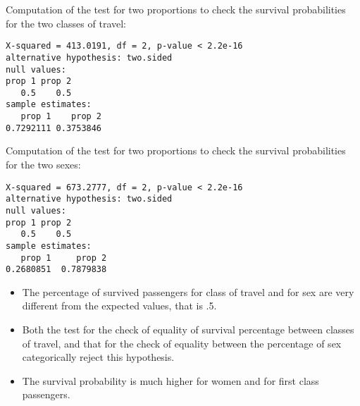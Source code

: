 \begin{frame}[fragile]
  Computation of the test for two proportions to check the survival probabilities for the two classes of travel:\\
  \begin{verbatim}
X-squared = 413.0191, df = 2, p-value < 2.2e-16
alternative hypothesis: two.sided
null values:
prop 1 prop 2
   0.5    0.5
sample estimates:
   prop 1    prop 2
0.7292111 0.3753846 
  \end{verbatim}
\end{frame}

\begin{frame}[fragile]
Computation of the test for two proportions to check the survival probabilities for the two sexes:\\
  \begin{verbatim}
X-squared = 673.2777, df = 2, p-value < 2.2e-16
alternative hypothesis: two.sided
null values:
prop 1 prop 2 
   0.5    0.5
sample estimates:
   prop 1     prop 2
0.2680851  0.7879838
  \end{verbatim}
\end{frame}

\begin{frame}
  \begin{itemize}
    \item The percentage of survived passengers for class of travel and for sex are very different from the expected values, that is .5. 
    \vspace{0.75cm}
    \item Both the test for the check of equality of survival percentage between classes of travel, and that for the check of equality between the percentage of sex categorically reject this hypothesis.
    \vspace{0.75cm}
    \item The survival probability is much higher for women and for first class passengers.
  \end{itemize}
\end{frame}


